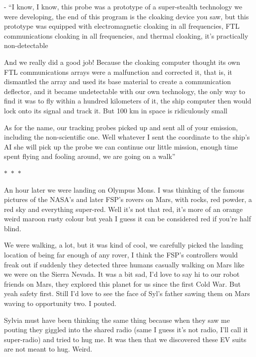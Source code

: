\documentclass[hidelinks,12pt,a4paper]{book}
\newcommand\sep{\begin{center}
  \boldmath $\ast$~$\ast$~$\ast$
\end{center}}
\begin{document}
- “I know, I know, this probe was a prototype of a super-stealth technology we were developing, 
the end of this program is the cloaking device you saw, but this prototype was equipped with electromagnetic 
cloaking in all frequencies, FTL communications cloaking in all frequencies, and thermal cloaking, 
it's practically non-detectable \newline

And we really did a good job! Because the cloaking computer thought its own FTL 
communications arrays were a malfunction and corrected it, that is, it dismantled the 
array and used its base material to create a communication deflector, and it became undetectable with 
our own technology, the only way to find it was to fly within a hundred kilometers of it, the ship computer then would
 lock onto its signal and track it. But 100 km in space is ridiculously small\newline

 As for the name, our tracking probes picked up and sent all of your 
 emission, including the non-scientific one. Well whatever I sent the coordinate 
 to the ship's AI she will pick up the probe we can continue our little mission, 
 enough time spent flying and fooling around, we are going on a walk”

\sep

An hour later we were landing on Olympus Mons. I was thinking of the famous pictures of the NASA's 
and later FSP's rovers on Mars, with rocks, red powder, a red sky and everything super-red.
Well it's not that red, it's more of an orange weird maroon rusty colour but yeah I guess it 
can be considered red if you're half blind.\par
\bigskip

We were walking, a lot, but it was kind of cool, we carefully picked the landing location of being 
far enough of any rover, I think the FSP's controllers would freak out if suddenly they detected three 
humans casually walking on Mars like we were on the Sierra Nevada. It was a bit sad, I'd love to say 
hi to our robot friends on Mars, they explored this planet for us since the first Cold War. 
But yeah safety first. Still I'd love to see the face of Syl's father sawing them on Mars waving 
to opportunity two. I pouted.\par
\bigskip

Sylvia must have been thinking the same thing because when they saw me pouting they giggled into 
the shared radio (same I guess it's not radio, I'll call it super-radio) and tried to hug me. It was 
then that we discovered these EV suits are not meant to hug. Weird.
\end{document}
